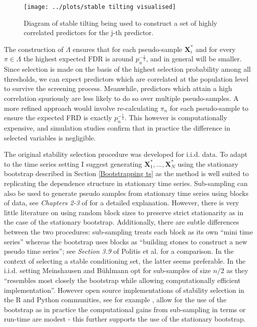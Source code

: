\documentclass[11pt]{report}\usepackage[utf8]{inputenc}
\begin{document}
\begin{figure}[H]
    \centering
    \texttt{[image: ../plots/stable tilting visualised]}
    \caption{Diagram of stable tilting being used to construct a set of highly correlated predictors for the j-th predictor.}
    \label{stable tilting fig}
\end{figure}

The construction of $\Lambda$ ensures that for each pseudo-sample $\boldsymbol{X}_i^*$ and for every $\pi \in \Lambda$ the highest expected FDR is around $p_n^{-\frac{1}{2}}$, and in general will be smaller. Since selection is made on the basis of the highest selection probability among all thresholds, we can expect predictors which are correlated at the population level to survive the screening process. Meanwhile, predictors which attain a high correlation spuriously are less likely to do so over multiple pseudo-samples. A more refined approach would involve re-calculating $\pi_{n}$ for each pseudo-sample to ensure the expected FRD is exactly $p_n^{-\frac{1}{2}}$. This however is computationally expensive, and simulation studies confirm that in practice the difference in selected variables is negligible.  

The original stability selection procedure was developed for $\text{i.i.d.}$ data. To adapt to the time series setting I suggest generating $\boldsymbol{X}_1^*,...,\boldsymbol{X}_N^*$ using the stationary bootstrap described in Section \ref{Bootstrapping ts} as the method is well suited to replicating the dependence structure in stationary time series. Sub-sampling can also be used to generate pseudo samples from stationary time series using blocks of data, see \textit{Chapters 2-3} of \cite{politis1999subsampling} for a detailed explanation. However, there is very little literature on using random block sizes to preserve strict stationarity as in the case of the stationary bootstrap. Additionally, there are subtle differences between the two procedures: sub-sampling treats each block as its own ``mini time series'' whereas the bootstrap uses blocks as ``building stones to construct a new pseudo time series''; see \textit{Section 3.9} of  Politis et al. for a comparison. In the context of selecting a stable conditioning set, the latter seems preferable. In the i.i.d. setting Meinshausen and Bühlmann opt for sub-samples of size $n/2$ as they ``resembles most closely the bootstrap while allowing computationally efficient implementation''. However open source implementations of stability selection in the R and Python communities, see for example \cite{Huijskens0stability}, allow for the use of the bootstrap as in practice the computational gains from sub-sampling in terms or run-time are modest - this further supports the use of the stationary bootstrap.
\end{document}
